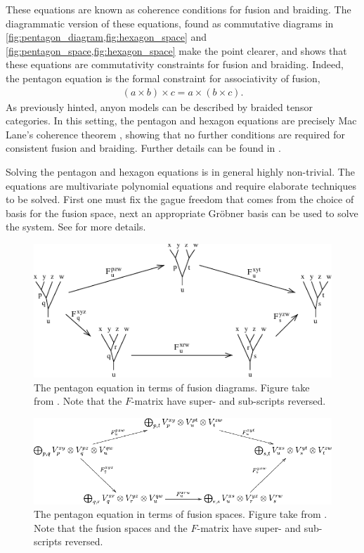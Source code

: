 \documentclass[a4paper,10pt,oneside]{book}
\theoremstyle{plain}
\theoremstyle{definition}
\theoremstyle{remark}
\begin{document}
{These equations are known as coherence conditions for fusion and braiding. The diagrammatic version of these equations, found as commutative diagrams in \cref{fig:pentagon_diagram,fig:hexagon_space} and \cref{fig:pentagon_space,fig:hexagon_space} make the point clearer, and shows that these equations are commutativity constraints for fusion and braiding. Indeed, the pentagon equation is the formal constraint for associativity of fusion,
\begin{align*}
  (a \times b) \times c = a \times (b \times c).
\end{align*}
As previously hinted, anyon models can be described by braided tensor categories. In this setting, the pentagon and hexagon equations are precisely Mac Lane's coherence theorem \cite{mac lane}, showing that no further conditions are required for consistent fusion and braiding. Further details can be found in \cite{kitaev,preskill}.

Solving the pentagon and hexagon equations is in general highly non-trivial. The equations are multivariate polynomial equations and require elaborate techniques to be solved. First one must fix the gague freedom that comes from the choice of basis for the fusion space, next an appropriate Gröbner basis can be used to solve the system. See \cite{bonderson} for more details.

\begin{figure}[h]
  \centering
  \includegraphics[width=1\linewidth]{img/pentagon_diagram.pdf}
  \caption{The pentagon equation in terms of fusion diagrams. Figure take from \cite{kitaev}. Note that the $F$-matrix have super- and sub-scripts reversed.}
  \label{fig:pentagon_diagram}
\end{figure}

\begin{figure}[h]
  \centering
  \includegraphics[width=1\linewidth]{img/pentagon_space.pdf}
  \caption{The pentagon equation in terms of fusion spaces. Figure take from \cite{kitaev}. Note that the fusion spaces and the $F$-matrix have super- and sub-scripts reversed.}
  \label{fig:pentagon_space}
\end{figure}


}
\end{document}

